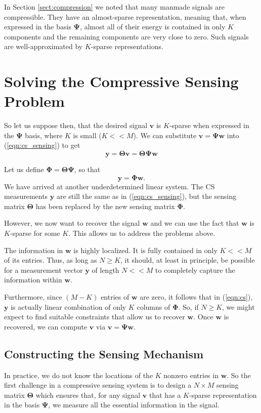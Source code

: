 In Section \ref{sect:compression} we noted that many manmade signals are compressible.
They have an almost-sparse representation, meaning that, when expressed in the basis $\bm\Psi$, almost all of their energy is contained in only $K$ components and the remaining components are very close to zero.
Such signals are well-approximated by $K$-sparse representations.

\section{Solving the Compressive Sensing Problem}
So let us suppose then, that the desired signal $\bm v$ is $K$-sparse when expressed in the $\bm\Psi$ basis, where $K$ is 
small ($K << M$).
We can substitute $\bm v = \bm\Psi\bm w$ into (\ref{eqn:cs_sensing}) to get
\begin{equation*}
  \bm y = \bm\Theta\bm v = \bm\Theta\bm\Psi\bm w
\end{equation*}

Let us define $\bm\Phi = \bm\Theta\bm\Psi$, so that
\begin{equation}
  \label{eqn:cs}
  \bm y = \bm\Phi\bm w .
\end{equation}
We have arrived at another underdetermined linear system.
The CS measurements $\bm y$ are still the same as in (\ref{eqn:cs_sensing}), but the sensing matrix $\bm\Theta$ has been replaced by the new sensing matrix $\bm\Phi$.

However, we now want to recover the signal $\bm w$ and we can use the fact that $\bm w$ is $K$-sparse for some $K$.
This allows us to address the problems above.

The information in $\bm w$ is highly localized.
It is fully contained in only $K << M$ of its entries.
Thus, as long as $N\geq K$, it should, at least in principle, be possible for a measurement vector $\bm y$ of length $N<<M$ to completely capture the information within $\bm w$.

Furthermore, since $(M-K)$ entries of $\bm w$ are zero, it follows that in (\ref{eqn:cs}), $\bm y$ is actually linear combination of only $K$ columns of $\bm\Phi$. 
So, if $N\geq K$, we might expect to find suitable constraints that allow us to recover $\bm w$.
Once $\bm w$ is recovered, we can compute $\bm v$ via $\bm v = \bm\Psi\bm w$.

\subsection{Constructing the Sensing Mechanism}
\label{sect:sensors}
In practice, we do not know the locations of the $K$ nonzero entries in $\bm w$.
So the first challenge in a compressive sensing system is to design a $N\times M$ sensing matrix $\bm\Theta$ which ensures that, for any signal $\bm v$ that has a $K$-sparse representation in the basis $\bm\Psi$, we measure all the essential information in the signal.

